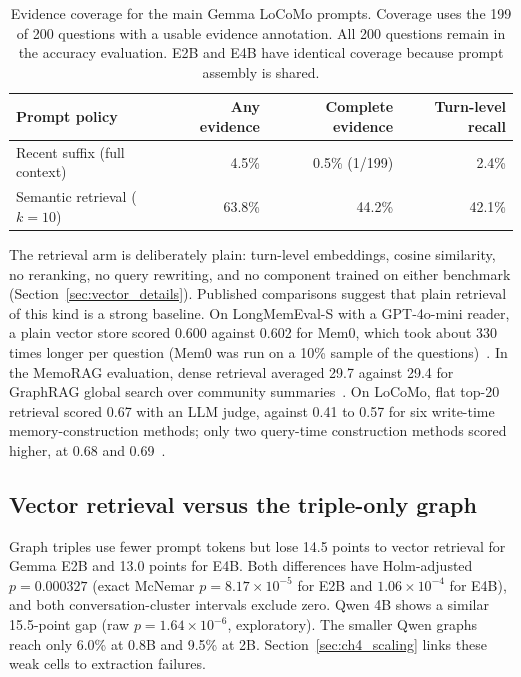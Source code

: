 \begin{table}[htbp]
  \centering
  \small
  \setlength{\tabcolsep}{8pt}
  \begin{tabular}{lrrr}
    \toprule
    Prompt policy & Any evidence & Complete evidence & Turn-level recall \\
    \midrule
    Recent suffix (full context) & 4.5\% & 0.5\% (1/199) & 2.4\% \\
    Semantic retrieval ($k=10$) & 63.8\% & 44.2\% & 42.1\% \\
    \bottomrule
  \end{tabular}
  \caption{Evidence coverage for the main Gemma LoCoMo prompts. Coverage uses the 199 of 200
           questions with a usable evidence annotation. All 200 questions remain in the accuracy
           evaluation. E2B and E4B have identical coverage because prompt assembly is shared.}
  \label{tab:ch4_main_coverage}
\end{table}

The retrieval arm is deliberately plain: turn-level embeddings, cosine similarity, no reranking, no
query rewriting, and no component trained on either benchmark (Section~\ref{sec:vector_details}).
Published comparisons suggest that plain retrieval of this kind is a strong baseline. On
LongMemEval-S with a GPT-4o-mini reader, a plain vector store scored 0.600 against 0.602 for Mem0,
which took about 330 times longer per question (Mem0 was run on a 10\% sample of the
questions)~\citep{ai_hippocampus}. In the MemoRAG evaluation, dense retrieval averaged 29.7 against
29.4 for GraphRAG global search over community summaries~\citep{memorag}. On LoCoMo, flat top-20
retrieval scored 0.67 with an LLM judge, against 0.41 to 0.57 for six write-time
memory-construction methods; only two query-time construction methods scored higher, at 0.68 and
0.69~\citep{lazymem}.

\subsection{Vector retrieval versus the triple-only graph}
\label{sec:ch4_vr_graph}

Graph triples use fewer prompt tokens but lose 14.5 points to vector retrieval for Gemma E2B and
13.0 points for E4B. Both differences have Holm-adjusted $p=0.000327$ (exact McNemar
$p=8.17\times10^{-5}$ for E2B and $1.06\times10^{-4}$ for E4B), and both conversation-cluster
intervals exclude zero. Qwen 4B shows a similar 15.5-point gap (raw
$p=1.64\times10^{-6}$, exploratory). The smaller Qwen graphs reach only 6.0\% at 0.8B and 9.5\%
at 2B. Section~\ref{sec:ch4_scaling} links these weak cells to extraction failures.

